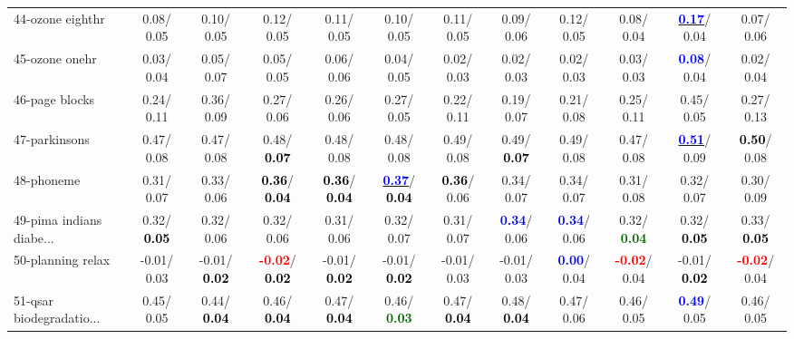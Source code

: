 \begin{table}[h]
\begin{center}
{\begin{tabular}{lc|c|c|c|c|c|c|c|c|c|c}
44-ozone eighthr &   0.08/  0.05 &   0.10/  0.05 &   0.12/  0.05 &   0.11/  0.05 &   0.10/  0.05 &   0.11/  0.05 &   0.09/  0.06 &   0.12/  0.05 &   0.08/  0.04 & \underline{\textcolor{blue}{\textbf{  0.17}}}/  0.04 &   0.07/  0.06 \\
45-ozone onehr &   0.03/  0.04 &   0.05/  0.07 &   0.05/  0.05 &   0.06/  0.06 &   0.04/  0.05 &   0.02/  0.03 &   0.02/  0.03 &   0.02/  0.03 &   0.03/  0.03 & \textcolor{blue}{\textbf{  0.08}}/  0.04 &   0.02/  0.04 \\
46-page blocks &   0.24/  0.11 &   0.36/  0.09 &   0.27/  0.06 &   0.26/  0.06 &   0.27/  0.05 &   0.22/  0.11 &   0.19/  0.07 &   0.21/  0.08 &   0.25/  0.11 &   0.45/  0.05 &   0.27/  0.13 \\ \hline
47-parkinsons &   0.47/  0.08 &   0.47/  0.08 &   0.48/\textcolor{black}{\textbf{  0.07}} &   0.48/  0.08 &   0.48/  0.08 &   0.49/  0.08 &   0.49/\textcolor{black}{\textbf{  0.07}} &   0.49/  0.08 &   0.47/  0.08 & \underline{\textcolor{blue}{\textbf{  0.51}}}/  0.09 & \textcolor{black}{\textbf{  0.50}}/  0.08 \\
48-phoneme &   0.31/  0.07 &   0.33/  0.06 & \textcolor{black}{\textbf{  0.36}}/\textcolor{black}{\textbf{  0.04}} & \textcolor{black}{\textbf{  0.36}}/\textcolor{black}{\textbf{  0.04}} & \underline{\textcolor{blue}{\textbf{  0.37}}}/\textcolor{black}{\textbf{  0.04}} & \textcolor{black}{\textbf{  0.36}}/  0.06 &   0.34/  0.07 &   0.34/  0.07 &   0.31/  0.08 &   0.32/  0.07 &   0.30/  0.09 \\
49-pima indians diabe... &   0.32/\textcolor{black}{\textbf{  0.05}} &   0.32/  0.06 &   0.32/  0.06 &   0.31/  0.06 &   0.32/  0.07 &   0.31/  0.07 & \textcolor{blue}{\textbf{  0.34}}/  0.06 & \textcolor{blue}{\textbf{  0.34}}/  0.06 &   0.32/\textcolor{darkgreen}{\textbf{  0.04}} &   0.32/\textcolor{black}{\textbf{  0.05}} &   0.33/\textcolor{black}{\textbf{  0.05}} \\
50-planning relax &  -0.01/  0.03 &  -0.01/\textcolor{black}{\textbf{  0.02}} & \textcolor{red}{\textbf{ -0.02}}/\textcolor{black}{\textbf{  0.02}} &  -0.01/\textcolor{black}{\textbf{  0.02}} &  -0.01/\textcolor{black}{\textbf{  0.02}} &  -0.01/  0.03 &  -0.01/  0.03 & \textcolor{blue}{\textbf{  0.00}}/  0.04 & \textcolor{red}{\textbf{ -0.02}}/  0.04 &  -0.01/\textcolor{black}{\textbf{  0.02}} & \textcolor{red}{\textbf{ -0.02}}/  0.04 \\
51-qsar biodegradatio... &   0.45/  0.05 &   0.44/\textcolor{black}{\textbf{  0.04}} &   0.46/\textcolor{black}{\textbf{  0.04}} &   0.47/\textcolor{black}{\textbf{  0.04}} &   0.46/\textcolor{darkgreen}{\textbf{  0.03}} &   0.47/\textcolor{black}{\textbf{  0.04}} &   0.48/\textcolor{black}{\textbf{  0.04}} &   0.47/  0.06 &   0.46/  0.05 & \textcolor{blue}{\textbf{  0.49}}/  0.05 &   0.46/  0.05 \\

\end{tabular}}
\end{center}
\end{table}

